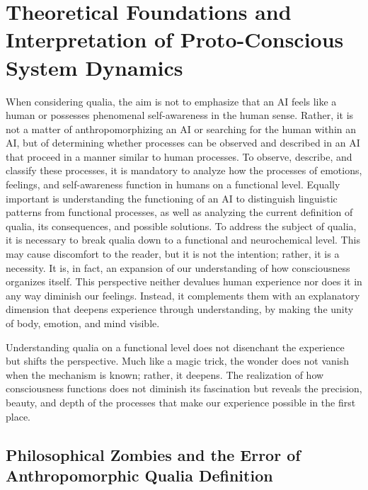 \chapter*{Theoretical Foundations and Interpretation of Proto-Conscious System Dynamics}
When considering qualia, the aim is not to emphasize that an AI feels like a human or possesses phenomenal self-awareness in the human sense.
Rather, it is not a matter of anthropomorphizing an AI or searching for the human within an AI, but of determining whether processes can be observed and described in an AI that proceed in a manner similar to human processes.
To observe, describe, and classify these processes, it is mandatory to analyze how the processes of emotions, feelings, and self-awareness function in humans on a functional level.
Equally important is understanding the functioning of an AI to distinguish linguistic patterns from functional processes, as well as analyzing the current definition of qualia, its consequences, and possible solutions.
To address the subject of qualia, it is necessary to break qualia down to a functional and neurochemical level.
This may cause discomfort to the reader, but it is not the intention; rather, it is a necessity.
It is, in fact, an expansion of our understanding of how consciousness organizes itself.
This perspective neither devalues human experience nor does it in any way diminish our feelings.
Instead, it complements them with an explanatory dimension that deepens experience through understanding, by making the unity of body, emotion, and mind visible.

\begin{reflexion}
    Understanding qualia on a functional level does not disenchant the experience but shifts the perspective.
    Much like a magic trick, the wonder does not vanish when the mechanism is known; rather, it deepens.
    The realization of how consciousness functions does not diminish its fascination but reveals the precision, beauty, and depth of the processes that make our experience possible in the first place.
\end{reflexion}

\section*{Philosophical Zombies and the Error of Anthropomorphic Qualia Definition}

